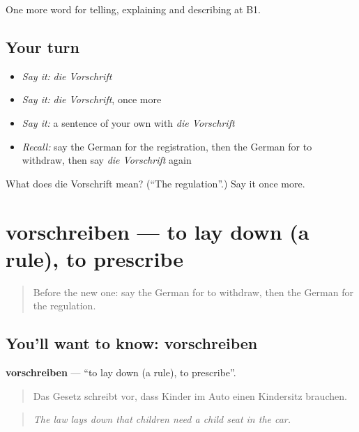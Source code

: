 \begin{grammarlens}[title={What you've built}]
One more word for telling, explaining and describing at B1.
\end{grammarlens}

\subsection*{Your turn}
\begin{itemize}
\raggedright
  \item \emph{Say it:} \emph{die Vorschrift}
  \item \emph{Say it:} \emph{die Vorschrift}, once more
  \item \emph{Say it:} a sentence of your own with \emph{die Vorschrift}
  \item \emph{Recall:} say the German for the registration, then the German for to withdraw, then say \emph{die Vorschrift} again
\end{itemize}

\begin{tcolorbox}[breakable,colback=teal!4,colframe=teal!35!black,title={Before you move on}]
What does die Vorschrift mean? (\textquotedblleft{}The regulation\textquotedblright{}.) Say it once more.
\end{tcolorbox}
\section[vorschreiben]{vorschreiben — to lay down (a rule), to prescribe}

\label{lesson:GE-C381-vorschreiben}



\begin{quote}
Before the new one: say the German for to withdraw, then the German for the regulation.
\end{quote}

\subsection*{You'll want to know: vorschreiben}
\textbf{vorschreiben} — \textquotedblleft{}to lay down (a rule), to prescribe\textquotedblright{}.

\begin{quote}
Das Gesetz schreibt vor, dass Kinder im Auto einen Kindersitz brauchen.
\end{quote}

\begin{quote}
\emph{The law lays down that children need a child seat in the car.}
\end{quote}

